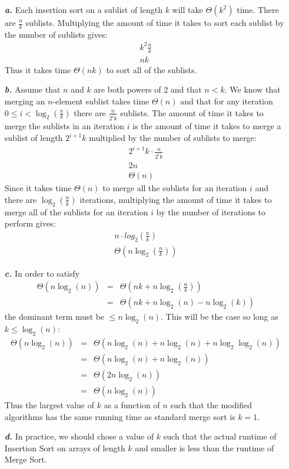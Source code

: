 \noindent\begin{enumerate}
	\item[\textbf{\textit{a.}}] Each insertion sort on a sublist of length $k$ will take $\Theta(k^2)$ time. There are $\frac{n}{k}$ sublists. Multiplying the amount of time it takes to sort each sublist by the number of sublists gives:
	\begin{eqnarray*}
		k^2 \frac{n}{k} \\
		nk
	\end{eqnarray*}
	Thus it takes time $\Theta(nk)$ to sort all of the sublists.

	\item[\textbf{\textit{b.}}] Assume that $n$ and $k$ are both powers of 2 and that $n < k$. We know that merging an $n$-element sublist takes time $\Theta(n)$ and that for any iteration $0 \leq i < \log_2(\frac{n}{k})$ there are $\frac{n}{2^i k}$ sublists. The amount of time it takes to merge the sublists in an iteration $i$ is the amount of time it takes to merge a sublist of length $2^{i+1} k$ multiplied by the number of sublists to merge:
	\begin{eqnarray*}
		2^{i+1} k \cdot \frac{n}{2^i k} \\
		2n \\
		\Theta(n)
	\end{eqnarray*}
	Since it takes time $\Theta(n)$ to merge all the sublists for an iteration $i$ and there are $\log_2(\frac{n}{k})$ iterations, multiplying the amount of time it takes to merge all of the sublists for an iteration $i$ by the number of iterations to perform gives:
	\begin{eqnarray*}
		n \cdot log_2(\frac{n}{k}) \\
		\Theta(n \log_2(\frac{n}{k}))
	\end{eqnarray*}

	\item[\textbf{\textit{c.}}] In order to satisfy
	\begin{eqnarray*}
		\Theta(n \log_2(n)) & = & \Theta(nk + n \log_2 (\frac{n}{k})) \\
		 & = & \Theta(nk + n \log_2 (n) - n \log_2 (k))
	\end{eqnarray*}
	the dominant term must be $\leq n \log_2(n)$.  This will be the case so long as $k \leq \log_2(n)$:
	\begin{eqnarray*}
		\Theta(n \log_2(n)) & = & \Theta(n \log_2(n) + n \log_2(n) + n \log_2 \log_2 (n)) \\
		 & = & \Theta(n \log_2(n) + n \log_2(n)) \\
		 & = & \Theta(2n \log_2(n)) \\
		 & = & \Theta(n \log_2(n))
	\end{eqnarray*}
	Thus the largest value of $k$ as a function of $n$ such that the modified algorithms has the same running time as standard merge sort is $k = 1$.

	\item[\textbf{\textit{d.}}] In practice, we should chose a value of $k$ such that the actual runtime of Insertion Sort on arrays of length $k$ and smaller is less than the runtime of Merge Sort.
\end{enumerate}
